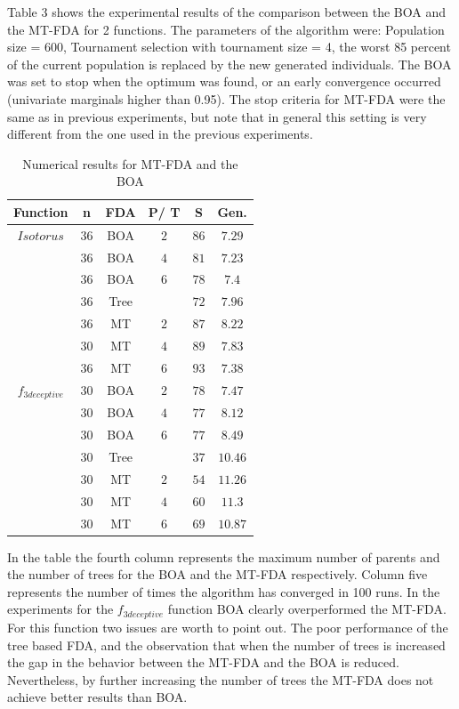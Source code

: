 \documentclass[10pt,thmsa]{article}
\begin{document}
Table 3 shows the experimental results of the comparison between the BOA and
the MT-FDA for 2 functions. The parameters of the algorithm were: Population
size = 600, Tournament selection with tournament size = 4, the worst 85
percent of the current population is replaced by the new generated
individuals. The BOA was set to stop when the optimum was found, or an early
convergence occurred (univariate marginals higher than 0.95). The stop
criteria for MT-FDA were the same as in previous experiments, but note that
in general this setting is very different from the one used in the previous
experiments.

\begin{table}[htbp]
\begin{center}
\begin{tabular}{|c|c|c|c|c|c|}
\hline
Function & n & FDA & P/ T & S & Gen. \\ \hline
$Isotorus$ & $36$ & BOA & $2$ & $86$ & $7.29$ \\ \hline
& $36$ & BOA & $4$ & $81$ & $7.23$ \\ \hline
& $36$ & BOA & $6$ & $78$ & $7.4$ \\ \hline
& $36$ & Tree &  & $72$ & $7.96$ \\ \hline
& $36$ & MT & $2$ & $87$ & $8.22$ \\ \hline
& $30$ & MT & $4$ & $89$ & $7.83$ \\ \hline
& $36$ & MT & $6$ & $93$ & $7.38$ \\ \hline
$f_{3deceptive}$ & $30$ & BOA & $2$ & $78$ & $7.47$ \\ \hline
& $30$ & BOA & $4$ & $77$ & $8.12$ \\ \hline
& $30$ & BOA & $6$ & $77$ & $8.49$ \\ \hline
& $30$ & Tree &  & $37$ & $10.46$ \\ \hline
& $30$ & MT & $2$ & $54$ & $11.26$ \\ \hline
& $30$ & MT & $4$ & $60$ & $11.3$ \\ \hline
& $30$ & MT & $6$ & $69$ & $10.87$ \\ \hline
\end{tabular}
\end{center}
\caption{Numerical results for MT-FDA and the BOA}
\end{table}

In the table the fourth column represents the maximum number of parents and
the number of trees for the BOA and the MT-FDA respectively. Column five
represents the number of times the algorithm has converged in 100 runs. In
the experiments for the $f_{3deceptive}$ function BOA clearly overperformed
the MT-FDA. For this function two issues are worth to point out. The poor
performance of the tree based FDA, and the observation that when the number
of trees is increased the gap in the behavior between the MT-FDA and the BOA
is reduced. Nevertheless, by further increasing the number of trees the
MT-FDA does not achieve better results than BOA.
\end{document}
